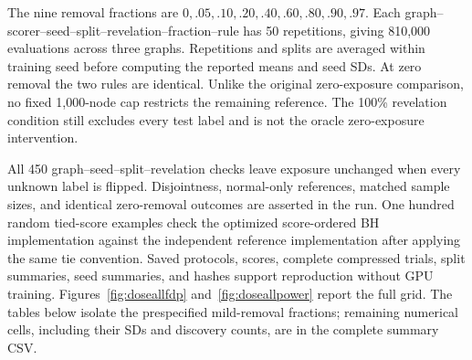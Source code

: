 The nine removal fractions are $0,.05,.10,.20,.40,.60,.80,.90,.97$. Each graph--scorer--seed--split--revelation--fraction--rule has 50 repetitions, giving 810,000 evaluations across three graphs. Repetitions and splits are averaged within training seed before computing the reported means and seed SDs. At zero removal the two rules are identical. Unlike the original zero-exposure comparison, no fixed 1,000-node cap restricts the remaining reference. The 100\% revelation condition still excludes every test label and is not the oracle zero-exposure intervention.

All 450 graph--seed--split--revelation checks leave exposure unchanged when every unknown label is flipped. Disjointness, normal-only references, matched sample sizes, and identical zero-removal outcomes are asserted in the run. One hundred random tied-score examples check the optimized score-ordered BH implementation against the independent reference implementation after applying the same tie convention. Saved protocols, scores, complete compressed trials, split summaries, seed summaries, and hashes support reproduction without GPU training. Figures~\ref{fig:doseallfdp} and~\ref{fig:doseallpower} report the full grid. The tables below isolate the prespecified mild-removal fractions; remaining numerical cells, including their SDs and discovery counts, are in the complete summary CSV.
